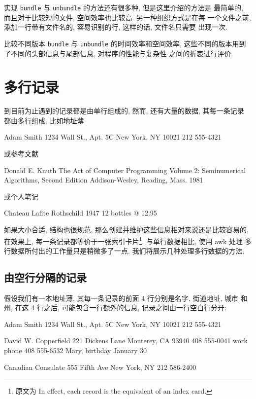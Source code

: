 实现 \verb'bundle' 与 \verb'unbundle' 的方法还有很多种, 但是这里介绍的方法是
最简单的, 而且对于比较短的文件, 空间效率也比较高. 另一种组织方式是在每
一个文件之前, 添加一行带有文件名的, 容易识别的行, 这样的话, 文件名只需要
出现一次.

\begin{exercise}
    比较不同版本 \verb'bundle' 与 \verb'unbundle' 的时间效率和空间效率,
    这些不同的版本用到了不同的头部信息与尾部信息, 对程序的性能与复杂性
    之间的折衷进行评价.
\end{exercise}

\section{多行记录}
\label{sec:multiline_records}

到目前为止遇到的记录都是由单行组成的, 然而, 还有大量的数据, 其每一条记录
都由多行组成, 比如地址薄
\begin{shell}
    Adam Smith
    1234 Wall St., Apt. 5C
    New York, NY 10021
    212 555-4321
\end{shell}
或参考文献
\begin{shell}
    Donald E. Knuth
    The Art of Computer Programming
    Volume 2: Seminumerical Algorithms, Second Edition
    Addison-Wesley, Reading, Mass.
    1981
\end{shell}
或个人笔记
\begin{shell}
    Chateau Lafite Rothschild 1947
    12 bottles @ 12.95
\end{shell}

如果大小合适, 结构也很规范, 那么创建并维护这些信息相对来说还是比较容易的,
在效果上, 每一条记录都等价于一张索引卡片\footnote{原文为 In effect, each
record is the equivalent of an index card.}. 与单行数据相比, 使用 awk 处理 
多行数据所付出的工作量只是稍微多了一点. 我们将展示几种处理多行数据的方法.

\subsection{由空行分隔的记录}
\label{subsec:records_separated_by_blank_lines}

假设我们有一本地址薄, 其每一条记录的前面 4 行分别是名字, 街道地址, 城市
和州, 在这 4 行之后, 可能包含一行额外的信息, 记录之间由一行空白行分开:
\begin{shell}
    Adam Smith
    1234 Wall St., Apt. 5C
    New York, NY 10021
    212 555-4321

    David W. Copperfield
    221 Dickens Lane
    Monterey, CA 93940
    408 555-0041
    work phone 408 555-6532
    Mary, birthday January 30

    Canadian Consulate
    555 Fifth Ave
    New York, NY
    212 586-2400
\end{shell}

